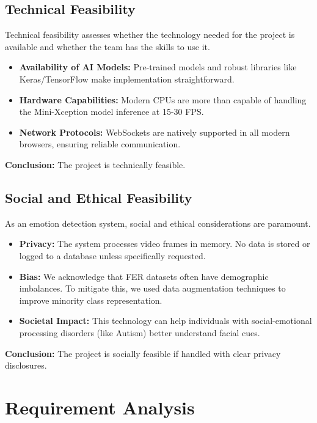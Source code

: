 \documentclass[12pt,a4paper]{report}
\begin{document}
\section{Technical Feasibility}
Technical feasibility assesses whether the technology needed for the project is available and whether the team has the skills to use it.
\begin{itemize}
    \item \textbf{Availability of AI Models:} Pre-trained models and robust libraries like Keras/TensorFlow make implementation straightforward.
    \item \textbf{Hardware Capabilities:} Modern CPUs are more than capable of handling the Mini-Xception model inference at 15-30 FPS.
    \item \textbf{Network Protocols:} WebSockets are natively supported in all modern browsers, ensuring reliable communication.
\end{itemize}
\textbf{Conclusion:} The project is technically feasible.

\section{Social and Ethical Feasibility}
As an emotion detection system, social and ethical considerations are paramount.
\begin{itemize}
    \item \textbf{Privacy:} The system processes video frames in memory. No data is stored or logged to a database unless specifically requested.
    \item \textbf{Bias:} We acknowledge that FER datasets often have demographic imbalances. To mitigate this, we used data augmentation techniques to improve minority class representation.
    \item \textbf{Societal Impact:} This technology can help individuals with social-emotional processing disorders (like Autism) better understand facial cues.
\end{itemize}
\textbf{Conclusion:} The project is socially feasible if handled with clear privacy disclosures.

\clearpage

\chapter{Requirement Analysis}
\end{document}
